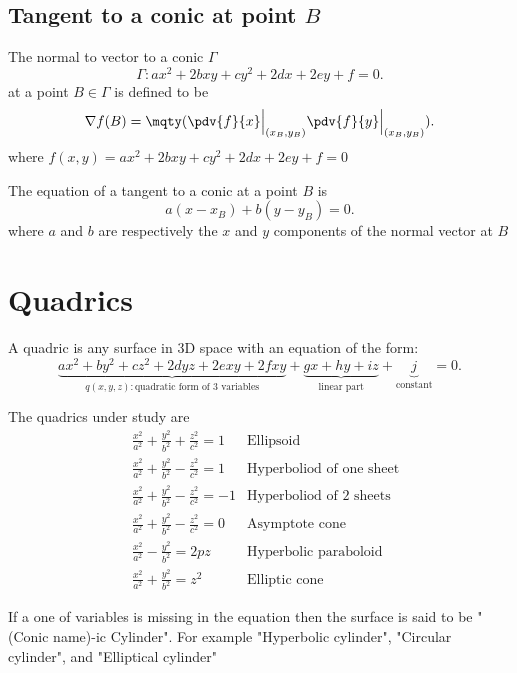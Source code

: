 \documentclass[a4paper,12pt]{article}
\begin{document}
\subsection{Tangent to a conic at point $B$ }
\begin{theorem}
	The normal to vector to a conic $\Gamma$
	\[
		\Gamma: ax^2+2bxy+cy^2+2dx+2ey+f=0
		.\]
	at a point $B\in\Gamma$ is defined to be
	\[
		\nabla  f(B) = \mqty(\pdv{f}{x} \Big|_{(x_B,y_B)}\\\pdv{f}{y} \Big|_{(x_B,y_B)})
		.\]
	where $f(x,y)=ax^2+2bxy+cy^2+2dx+2ey+f=0
	$
\end{theorem}

The equation of a tangent to a conic at a point $B$ is
\[
	a(x-x_B)+b(y-y_B)=0
	.\]
where $a$ and $b$ are respectively the $x$ and $y$ components of the normal vector at $B$


\section{Quadrics}

\begin{definition}
	A quadric is any surface in 3D space with an equation of the form:
	\[
		\underbrace{ax^2+by^2+cz^2+2dyz+2exy+2fxy}_{q(x,y,z):\text{quadratic form of 3 variables}}+\underbrace{gx+hy+iz}_{\text{linear part}}+\underbrace{j}_{\text{constant}}=0
		.\]
\end{definition}
The quadrics under study are
\begin{align*}
	 & \frac{x^2}{a^2}+\frac{y^2}{b^2}+\frac{z^2}{c^2}=1   & \text{Ellipsoid}                \\
	 & \frac{x^2}{a^2}+\frac{y^2}{b^2}-\frac{z^2}{c^2}=1   & \text{Hyperboliod of one sheet} \\
	 & \frac{x^2}{a^2} +\frac{y^2}{b^2}-\frac{z^2}{c^2}=-1 & \text{Hyperboliod of 2 sheets}  \\
	 & \frac{x^2}{a^2}+\frac{y^2}{b^2}-\frac{z^2}{c^2}=0   & \text{Asymptote cone}           \\
	 & \frac{x^2}{a^2}-\frac{y^2}{b^2}=2pz                 & \text{Hyperbolic paraboloid}    \\
	 & \frac{x^2}{a^2}+\frac{y^2}{b^2}=z^2                 & \text{Elliptic cone}
\end{align*}

If a one of variables is missing in the equation then the surface is said to be "(Conic name)-ic Cylinder". For example "Hyperbolic cylinder", "Circular cylinder", and "Elliptical cylinder"
\end{document}
